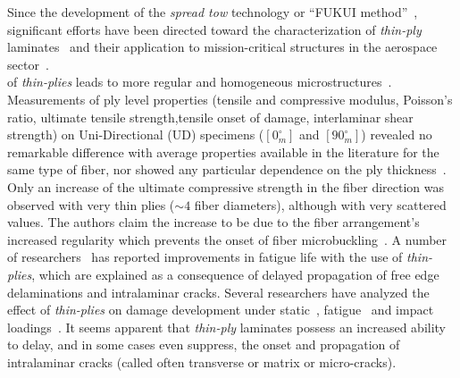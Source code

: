 \documentclass[Review,sagev,times]{sagej}
\begin{document}
Since the development of the \emph{spread tow} technology or ``FUKUI method''~\cite{Kawabe2008}, significant efforts have been directed toward the characterization of \emph{thin-ply} laminates~\cite{Yamaguchi2005,Sihn2007,Yokozeki2008,Yokozeki2010,Saito2012,Arteiro2013,Arteiro2014,Amacher2014,Guillamet2014,Cugnoni2018} and their application to mission-critical structures in the aerospace sector~\cite{Kopp2017}.\\%
 of \emph{thin-plies} leads to more regular and homogeneous microstructures~\cite{Saito2012,Amacher2014}. Measurements of ply level properties (tensile and compressive modulus, Poisson's ratio, ultimate tensile strength,tensile onset of damage, interlaminar shear strength) on Uni-Directional (UD) specimens ($\left[0_{m}^{\circ}\right]$ and $\left[90_{m}^{\circ}\right]$) revealed no remarkable difference with average properties available in the literature for the same type of fiber, nor showed any particular dependence on the ply thickness~\cite{Amacher2014}. Only an increase of the ultimate compressive strength in the fiber direction was observed with very thin plies ($\sim4$ fiber diameters), although with very scattered values. The authors claim the increase to be due to the fiber arrangement's increased regularity which prevents the onset of fiber microbuckling~\cite{Amacher2014}. A number of researchers~\cite{Yamaguchi2005,Sihn2007,Yokozeki2008} has reported improvements in fatigue life with the use of \emph{thin-plies}, which are explained as a consequence of delayed propagation of free edge delaminations and intralaminar cracks. Several researchers have analyzed the effect of \emph{thin-plies} on damage development under static~\cite{Sihn2007,Yokozeki2008,Yokozeki2010,Saito2012,Arteiro2013,Arteiro2014,Amacher2014}, fatigue~\cite{Yamaguchi2005,Sihn2007,Yokozeki2008,Yokozeki2010,Amacher2014} and impact loadings~\cite{Sihn2007,Yokozeki2008,Yokozeki2010,Amacher2014}. It seems apparent that \emph{thin-ply} laminates possess an increased ability to delay, and in some cases even suppress, the onset and propagation of intralaminar cracks (called often transverse or matrix or micro-cracks).\\
\end{document}
